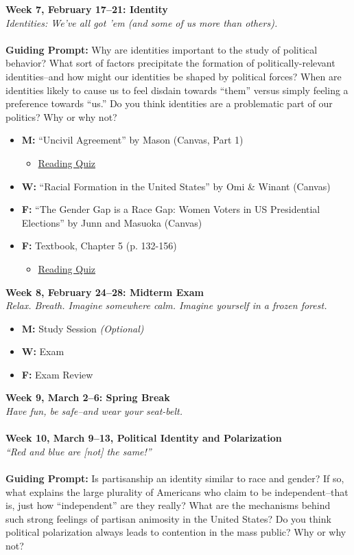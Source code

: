 \documentclass[11pt]{article}
\def\doubleq#1{``#1''}
\begin{document}
\textbf{Week 7, February 17--21: Identity}
\\
\textit{Identities: We've all got 'em (and some of us more than others).}
\\\\
\textbf{Guiding Prompt:} Why are identities important to the study of political behavior? What sort of factors precipitate the formation of politically-relevant identities--and how might our identities be shaped by political forces? When are identities likely to cause us to feel disdain towards ``them'' versus simply feeling a preference towards ``us.'' Do you think identities are a problematic part of our politics? Why or why not? 
\begin{itemize}
\item \textbf{M:} \doubleq{Uncivil Agreement} by Mason (Canvas, Part 1)
\begin{itemize}
\item\underline{Reading Quiz}
\end{itemize}
\item \textbf{W:} \doubleq{Racial Formation in the United States} by Omi \& Winant (Canvas)
\item \textbf{F:} \doubleq{The Gender Gap is a Race Gap: Women Voters in US Presidential Elections} by Junn and Masuoka (Canvas)
\item \textbf{F:} Textbook, Chapter 5 (p. 132-156)
\begin{itemize}
\item\underline{Reading Quiz}
\end{itemize}
\end{itemize}
\textbf{Week 8, February 24--28: Midterm Exam}
\\
\textit{Relax. Breath. Imagine somewhere calm. Imagine yourself in a frozen forest.}
\begin{itemize}
\item \textbf{M:} Study Session \textit{(Optional)}
\item \textbf{W:} Exam
\item \textbf{F:} Exam Review
\end{itemize}

\textbf{Week 9, March 2--6: Spring Break}
\\
\textit{Have fun, be safe--and wear your seat-belt.}
\\\\


\textbf{Week 10, March 9--13, Political Identity and Polarization}
\\
\textit{``Red and blue are [not] the same!''}
\\\\
\textbf{Guiding Prompt:} Is partisanship an identity similar to race and gender? If so, what explains the large plurality of Americans who claim to be independent--that is, just how ``independent'' are they really? What are the mechanisms behind such strong feelings of partisan animosity in the United States? Do you think political polarization always leads to contention in the mass public? Why or why not?
\end{document}
